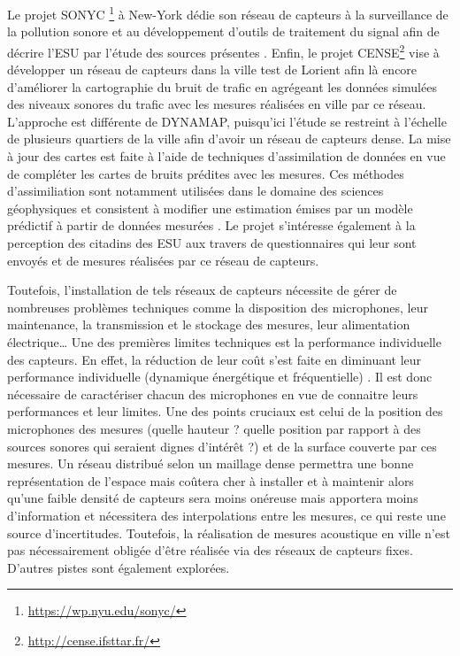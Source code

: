 Le projet SONYC \footnote{\url{https://wp.nyu.edu/sonyc/}} à New-York dédie son réseau de capteurs à la surveillance de la pollution sonore et au développement d'outils de traitement du signal afin de décrire l'ESU par l'étude des sources présentes \cite{mydlarz2017noise}.
Enfin, le projet CENSE\footnote{\url{http://cense.ifsttar.fr/}} vise à développer un réseau de capteurs dans la ville test de Lorient afin là encore d'améliorer la cartographie du bruit de trafic en agrégeant les données simulées des niveaux sonores du trafic avec les mesures réalisées en ville par ce réseau. L'approche est différente de DYNAMAP, puisqu'ici l'étude se restreint à l'échelle de plusieurs quartiers de la ville afin d'avoir un réseau de capteurs dense. La mise à jour des cartes est faite à l'aide de techniques d'assimilation de données en vue de compléter les cartes de bruits prédites avec les mesures.
Ces méthodes d'assimiliation sont notamment utilisées dans le domaine des sciences géophysiques et consistent à modifier une estimation émises par un modèle prédictif à partir de données mesurées \cite{wu2008comparison}.
Le projet s'intéresse également à la perception des citadins des ESU aux travers de questionnaires qui leur sont envoyés et de mesures réalisées par ce réseau de capteurs.

Toutefois, l'installation de tels réseaux de capteurs nécessite de gérer de nombreuses problèmes techniques comme la disposition des microphones, leur maintenance, la transmission et le stockage des mesures, leur alimentation électrique\dots{} Une des premières limites techniques est la performance individuelle des capteurs. En effet, la réduction de leur coût s'est faite en diminuant leur performance  individuelle (dynamique énergétique et fréquentielle) \cite{mydlarz2015design}. Il est donc nécessaire de caractériser chacun des microphones en vue de connaitre leurs performances et leur limites. Une des points cruciaux est celui de la position des microphones des mesures (quelle hauteur ? quelle position par rapport à des sources sonores qui seraient dignes d'intérêt ?) et de la surface couverte par ces mesures. Un réseau distribué selon un maillage dense permettra une bonne représentation de l'espace mais coûtera cher à installer et à maintenir alors qu'une faible densité de capteurs sera moins onéreuse mais apportera moins d'information et nécessitera des interpolations entre les mesures, ce qui reste une source d'incertitudes. Toutefois, la réalisation de mesures acoustique en ville n'est pas nécessairement obligée d'être réalisée via des réseaux de capteurs fixes. D'autres pistes sont également explorées.

